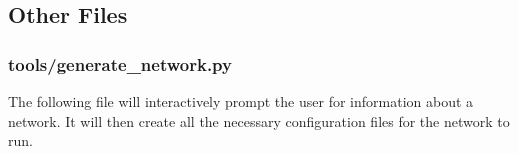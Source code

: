 \documentclass[11pt]{article} %
\begin{document}
\newpage
\subsection{Other Files}

\subsubsection{tools/generate\_network.py} \label{generatenet}
The following file will interactively prompt the user for information about a network. It will then create all the necessary configuration files for the network to run.

\end{document}
